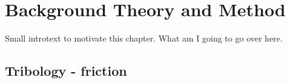 \newpage
\chapter{Background Theory and Method}

Small introtext to motivate this chapter. What am I going to go over here.


\section{Tribology - friction}












